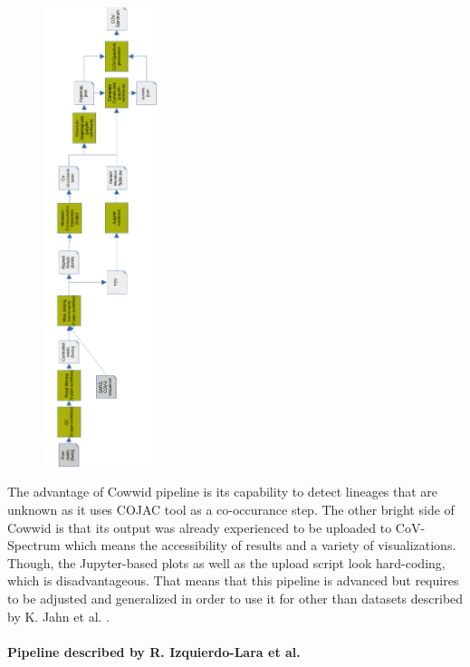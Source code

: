         \begin{figure}[h]
        	\centering
            \includegraphics[width=0.3\textwidth]{figures/prior/cowwid_vertical.png}
            \label{fig:prior:cowwid}
        \end{figure}
        
        The advantage of Cowwid pipeline is its capability to detect lineages that are unknown as it uses COJAC tool as a co-occurance step. The other bright side of Cowwid is that its output was already experienced to be uploaded to CoV-Spectrum which means the accessibility of results and a variety of visualizations. Though, the Jupyter-based plots as well as the upload script look hard-coding, which is disadvantageous. That means that this pipeline is advanced but requires to be adjusted and generalized in order to use it for other than datasets described by K. Jahn et al. \cite{jahn2022}. 
        
        \paragraph{Pipeline described by R. Izquierdo-Lara et al.}
        
